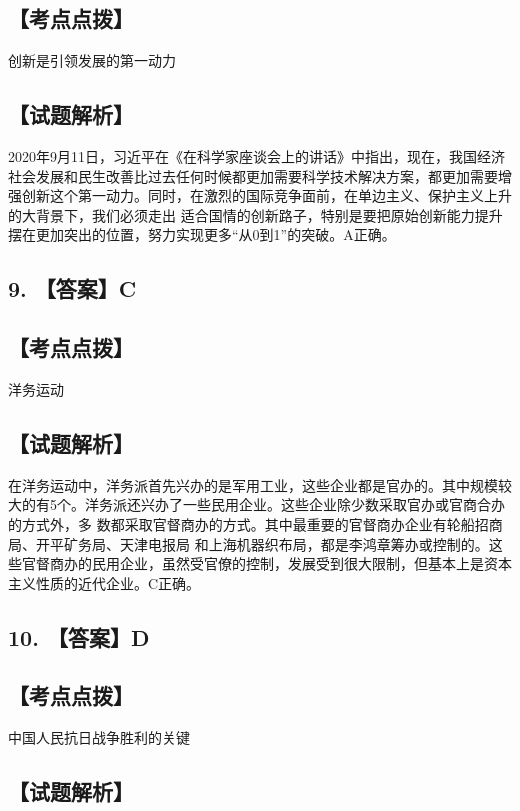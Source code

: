 \documentclass[UTF8,11pt]{ctexart}
\begin{document}
\subsection*{【考点点拨】}

创新是引领发展的第一动力


\subsection*{【试题解析】}

2020年9月11日，习近平在《在科学家座谈会上的讲话》中指出，现在，我国经济 社会发展和民生改善比过去任何时候都更加需要科学技术解决方案，都更加需要增强创新这个第一动力。同时，在激烈的国际竞争面前，在单边主义、保护主义上升的大背景下，我们必须走出 适合国情的创新路子，特别是要把原始创新能力提升摆在更加突出的位置，努力实现更多“从0到1”的突破。A正确。


\subsection*{9. 【答案】C}

\subsection*{【考点点拨】}

洋务运动


\subsection*{【试题解析】}

在洋务运动中，洋务派首先兴办的是军用工业，这些企业都是官办的。其中规模较大的有5个。洋务派还兴办了一些民用企业。这些企业除少数采取官办或官商合办的方式外，多 数都采取官督商办的方式。其中最重要的官督商办企业有轮船招商局、开平矿务局、天津电报局 和上海机器织布局，都是李鸿章筹办或控制的。这些官督商办的民用企业，虽然受官僚的控制，发展受到很大限制，但基本上是资本主义性质的近代企业。C正确。


\subsection*{10. 【答案】D}

\subsection*{【考点点拨】}

中国人民抗日战争胜利的关键


\subsection*{【试题解析】}
\end{document}
